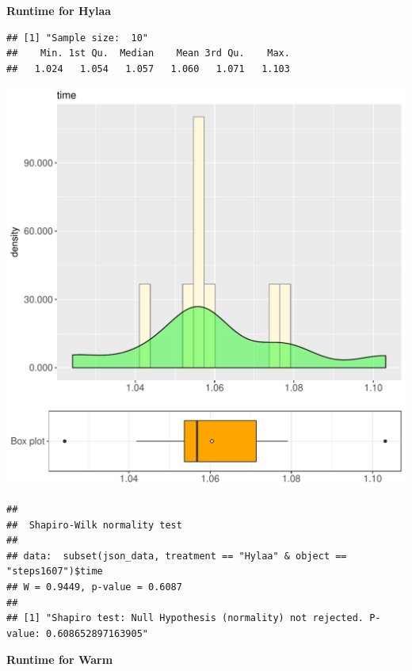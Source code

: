 \documentclass{article}\usepackage[]{graphicx}\usepackage[]{color}
\makeatletter
\def\maxwidth{ %
  \ifdim\Gin@nat@width>\linewidth
    \linewidth
  \else
    \Gin@nat@width
  \fi
}
\newenvironment{kframe}{%
 \def\at@end@of@kframe{}%
 \ifinner\ifhmode%
  \def\at@end@of@kframe{\end{minipage}}%
  \begin{minipage}{\columnwidth}%
 \fi\fi%
 \def\FrameCommand##1{\hskip\@totalleftmargin \hskip-\fboxsep
 \colorbox{shadecolor}{##1}\hskip-\fboxsep
     \hskip-\linewidth \hskip-\@totalleftmargin \hskip\columnwidth}%
 \MakeFramed {\advance\hsize-\width
   \@totalleftmargin\z@ \linewidth\hsize
   \@setminipage}}%
 {\par\unskip\endMakeFramed%
 \at@end@of@kframe}
\newenvironment{knitrout}{}{} %
\makeatother
\begin{document}
 \textbf{Runtime for Hylaa}
\begin{knitrout}
\color{fgcolor}\begin{kframe}
\begin{verbatim}
## [1] "Sample size:  10"
##    Min. 1st Qu.  Median    Mean 3rd Qu.    Max. 
##   1.024   1.054   1.057   1.060   1.071   1.103
\end{verbatim}
\end{kframe}
\includegraphics[width=\maxwidth]{figure/RH1_Hylaa_steps1607-1} 
\begin{kframe}\begin{verbatim}
## 
## 	Shapiro-Wilk normality test
## 
## data:  subset(json_data, treatment == "Hylaa" & object == "steps1607")$time
## W = 0.9449, p-value = 0.6087
## 
## [1] "Shapiro test: Null Hypothesis (normality) not rejected. P-value: 0.608652897163905"
\end{verbatim}
\end{kframe}
\end{knitrout}
 \textbf{Runtime for Warm}
\end{document}
